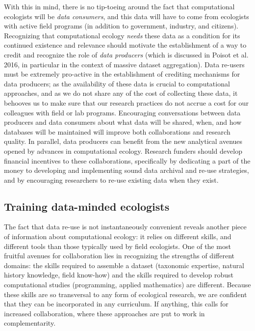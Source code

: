 \documentclass[12pt]{article}
\begin{document}
With this in mind, there is no tip-toeing around the fact that
computational ecologists will be \emph{data consumers}, and this data
will have to come from ecologists with active field programs (in
addition to government, industry, and citizens). Recognizing that
computational ecology \emph{needs} these data as a condition for its
continued existence and relevance should motivate the establishment of a
way to credit and recognize the role of \emph{data producers} (which is
discussed in Poisot et al. 2016, in particular in the context of massive
dataset aggregation). Data re-users must be extremely pro-active in the
establishment of crediting mechanisms for data producers; as the
availability of these data is crucial to computational approaches, and
as we do not share any of the cost of collecting these data, it behooves
us to make sure that our research practices do not accrue a cost for our
colleagues with field or lab programs. Encouraging conversations between
data producers and data consumers about what data will be shared, when,
and how databases will be maintained will improve both collaborations
and research quality. In parallel, data producers can benefit from the
new analytical avenues opened by advances in computational ecology.
Research funders should develop financial incentives to these
collaborations, specifically by dedicating a part of the money to
developing and implementing sound data archival and re-use strategies,
and by encouraging researchers to re-use existing data when they exist.

\hypertarget{training-data-minded-ecologists}{%
\subsection{Training data-minded
ecologists}\label{training-data-minded-ecologists}}

The fact that data re-use is not instantaneously convenient reveals
another piece of information about computational ecology: it relies on
different skills, and different tools than those typically used by field
ecologists. One of the most fruitful avenues for collaboration lies in
recognizing the strengths of different domains: the skills required to
assemble a dataset (taxonomic expertise, natural history knowledge,
field know-how) and the skills required to develop robust computational
studies (programming, applied mathematics) are different. Because these
skills are so transversal to any form of ecological research, we are
confident that they can be incorporated in any curriculum. If anything,
this calls for increased collaboration, where these approaches are put
to work in complementarity.
\end{document}
